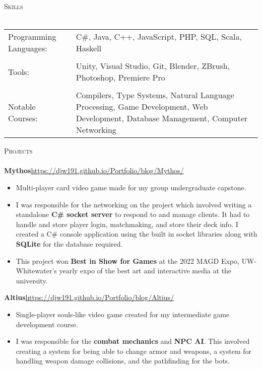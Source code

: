 \documentclass[letter, 12pt]{article}
\newcommand{\lineunder} {
    \vspace*{-8pt} \\
    \hspace*{-18pt} \hrulefill \\
}
\newcommand{\header} [1] {
    {\hspace*{-18pt}\vspace*{6pt} \textsc{#1}}
    \vspace*{-6pt} \lineunder
}
\begin{document}
\header{Skills}
\begin{tabular}{p{2in}p{4.25in}}
	Programming Languages: & C\#, Java, C++, JavaScript, PHP, SQL, Scala, Haskell                                                                                                                            \\
\\
	Tools:                 & Unity, Visual Studio, Git, Blender, ZBrush, Photoshop, Premiere Pro                                                                                                             \\
\\
	Notable Courses:      & Compilers, Type Systems, Natural Language Processing, Game Development, Web Development, Database Management, Computer Networking \\
\end{tabular}
\vspace{2mm}

\header{Projects}
{\textbf{Mythos}}\hfill \url{https://djw191.github.io/Portfolio/blog/Mythos/}\\
\begin{itemize} \itemsep 1pt
	\item Multi-player card video game made for my group undergraduate capstone.
	\item I was responsible for the networking on the project which involved writing a standalone \textbf{C\# socket server} to respond to and manage clients. It had to handle and store player login, matchmaking, and store their deck info. I created a C\# console application using the built in socket libraries along with \textbf{SQLite} for the database required.\\
	\item This project won \textbf{Best in Show for Games} at the 2022 MAGD Expo, UW-Whitewater's yearly expo of the best art and interactive media at the university.
\end{itemize}
\vspace*{2mm}
{\textbf{Altius}}\hfill \url{https://djw191.github.io/Portfolio/blog/Altius/}\\
\begin{itemize} \itemsep 1pt
	\item Single-player souls-like video game created for my intermediate game development course. \\
	\item I was responsible for the \textbf{combat mechanics} and \textbf{NPC AI}. This involved creating a system for being able to change armor and weapons, a system for handling weapon damage collisions, and the pathfinding for the bots.\\
\end{itemize}
\vspace*{2mm}

\ 
\end{document}
